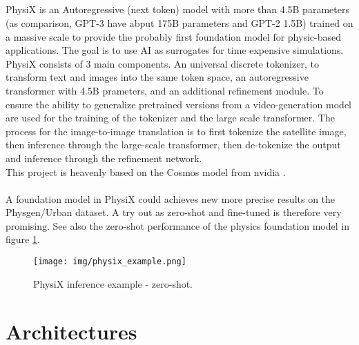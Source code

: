 		\subsection{}
			PhysiX is an Autoregressive (next token) model with more than 4.5B parameters (as comparison, GPT-3 have abput 175B parameters and GPT-2 1.5B) trained on a massive scale to provide the probably first foundation model for physic-based applications. The goal is to use AI as surrogates for time expensive simulations. 
			PhysiX consists of 3 main components. An universal discrete tokenizer, to transform text and images into the same token space, an autoregressive transformer with 4.5B prameters, and an additional refinement module.
			To ensure the ability to generalize pretrained versions from a video-generation model are used  for the training of the tokenizer and the large scale transformer.
			The process for the image-to-image translation is to first tokenize the satellite image, then inference through the large-scale transformer, then de-tokenize the output and inference through the refinement network.\\
			This project is heavenly based on the Cosmos model from nvidia \cite{nvidia2025cosmosworldfoundationmodel}.\\
			\\
			A foundation model in PhysiX could achieves new more precise results on the Physgen/Urban dataset. A try out as zero-shot and fine-tuned is therefore very promising. See also the zero-shot performance of the physics foundation model in figure \ref{fig:physix}.
			\begin{figure}[H]
				\centering
				\texttt{[image: img/physix\_example.png]}
				\caption[PhysiX inference example - zero-shot.]{PhysiX inference example - zero-shot.}
				\label{fig:physix}
			\end{figure}
			
	
	
	\newpage
	\section{Architectures}
	\label{sec:lit-architecture}
		
